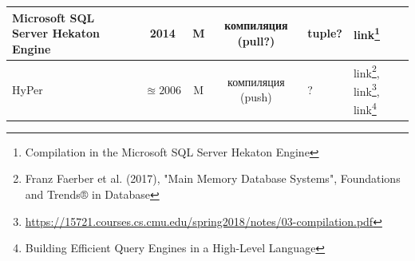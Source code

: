 \documentclass{beamer}
\begin{document}
\begin{frame}[allowframebreaks]
\begin{table}
\begin{longtable}{|p{2cm}|c|c|c|p{2.5cm}|p{1cm}|}
	Microsoft SQL Server Hekaton Engine & 2014 & M & компиляция (pull?) & tuple? & link\footnote{Compilation in the Microsoft SQL Server Hekaton Engine}\\
	
	\hline
	
	
	HyPer & $\approxeq 2006$ & M & компиляция (push) & ? & link\footnote{Franz Faerber et al. (2017), "Main Memory Database Systems", Foundations and Trends® in Database}, link\footnote{\url{https://15721.courses.cs.cmu.edu/spring2018/notes/03-compilation.pdf}}, link\footnote{Building Efficient Query Engines in a High-Level Language}\\
	

	

	
	
	\hline
\end{longtable}

\end{table}	

\end{frame}
\end{document}
